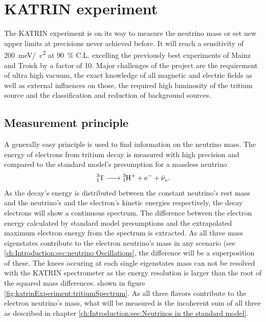 %

    \chapter{KATRIN experiment}
    \label{ch:The KATRIN experiment}
    The KATRIN experiment is on its way to measure the neutrino mass or set new upper limits at precisions never achieved before. It will reach a sensitivity of \SI{200}{\milli\electronvolt}/\SI{}{\square c} at \SI{90}{\percent} C.L. excelling the previously best experiments of Mainz and Troisk by a factor of \SI{10}{}. Major challenges of the project are the requirement of ultra high vacuum, the exact knowledge of all magnetic and electric fields as well as external influences on those, the required high luminosity of the tritium source and the classification and reduction of background sources.
    
      \section{Measurement principle}
      \label{ch:The KATRIN experiment:sec:Measurement Principle}
      A generally easy principle is used to find information on the neutrino mass. The energy of electrons from tritium decay is measured with high precision and compared to the standard model's presumption for a massless neutrino \cite{Otten:2008zz}
      \begin{equation}
      	\ce{^3_1T -> ^3_1H^+ + e^- + \bar{\nu}_e}.
      \end{equation}
      As the decay's energy is distributed between the constant neutrino's rest mass and the neutrino's and the electron's kinetic energies respectively, the decay electrons will show a continuous spectrum. The difference between the electron energy calculated by standard model presumptions and the extrapolated maximum electron energy from the spectrum is extracted. As all three mass eigenstates contribute to the electron neutrino's mass in any scenario (see \ref{ch:Introduction:sec:neutrino Oscillations}, the difference will be a superposition of these. The knees occuring at each single eigenstates mass can not be resolved with the KATRIN spectrometer as the energy resolution is larger than the root of the squared mass differences.
      shown in figure \ref{fig:katrinExperiment:tritiumSpectrum}. As all three flavors contribute to the electron neutrino's mass, what will be measured is the incoherent sum of all three as described in chapter \ref{ch:Introduction:sec:Neutrinos in the standard model}.
      
